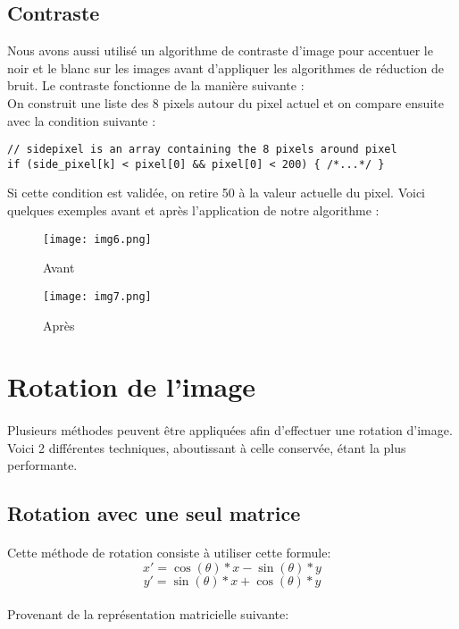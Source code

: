 \documentclass{article}
\begin{document}
\subsection{Contraste}
Nous avons aussi utilisé un algorithme de contraste d’image pour accentuer le noir et le blanc sur les images avant d’appliquer les algorithmes de réduction de bruit. Le contraste fonctionne de la manière suivante :\\
On construit une liste des 8 pixels autour du pixel actuel et on compare ensuite avec la condition suivante :
\begin{lstlisting}
// sidepixel is an array containing the 8 pixels around pixel
if (side_pixel[k] < pixel[0] && pixel[0] < 200) { /*...*/ }
\end{lstlisting}
Si cette condition est validée, on retire 50 à la valeur actuelle du pixel. 
Voici quelques exemples avant et après l’application de notre algorithme :
\begin{figure}[H]
    \centering
    \texttt{[image: img6.png]}
    \caption{Avant}
    \texttt{[image: img7.png]}
    \caption{Après}
\end{figure}

\newpage
\section{Rotation de l'image}
\paragraph{}
Plusieurs méthodes peuvent être appliquées afin d’effectuer une rotation d’image. Voici 2 différentes techniques, aboutissant à celle conservée, étant la plus performante.
\subsection{Rotation avec une seul matrice}
\paragraph{}
Cette méthode de rotation consiste à utiliser cette formule:
$$
x' = \cos(\theta) * x - \sin(\theta) * y
$$
$$
y' = \sin(\theta) * x + \cos(\theta) * y
$$
\paragraph{}
Provenant de la représentation matricielle suivante:\\
\end{document}

